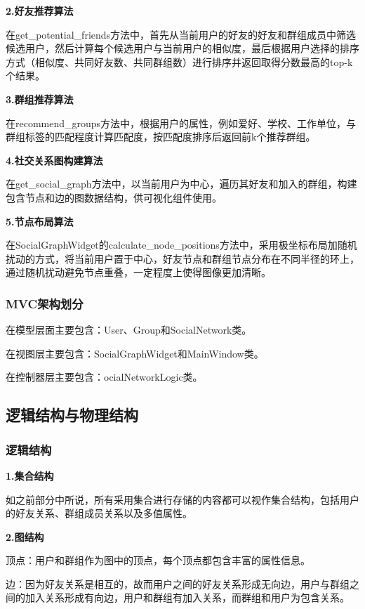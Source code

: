 \documentclass[12pt,a4paper]{article}
\begin{document}
\noindent\textbf{2.好友推荐算法}

在get\_potential\_friends方法中，首先从当前用户的好友的好友和群组成员中筛选候选用户，然后计算每个候选用户与当前用户的相似度，最后根据用户选择的排序方式（相似度、共同好友数、共同群组数）进行排序并返回取得分数最高的top-k个结果。

\noindent\textbf{3.群组推荐算法}

在recommend\_groups方法中，根据用户的属性，例如爱好、学校、工作单位，与群组标签的匹配程度计算匹配度，按匹配度排序后返回前k个推荐群组。

\noindent\textbf{4.社交关系图构建算法}

在get\_social\_graph方法中，以当前用户为中心，遍历其好友和加入的群组，构建包含节点和边的图数据结构，供可视化组件使用。

\noindent\textbf{5.节点布局算法}

在SocialGraphWidget的calculate\_node\_positions方法中，采用极坐标布局加随机扰动的方式，将当前用户置于中心，好友节点和群组节点分布在不同半径的环上，通过随机扰动避免节点重叠，一定程度上使得图像更加清晰。

\subsubsection{MVC架构划分}

在模型层面主要包含：User、Group和SocialNetwork类。

在视图层主要包含：SocialGraphWidget和MainWindow类。

在控制器层主要包含：ocialNetworkLogic类。

\subsection{逻辑结构与物理结构}

\subsubsection{逻辑结构}

\noindent\textbf{1.集合结构}

如之前部分中所说，所有采用集合进行存储的内容都可以视作集合结构，包括用户的好友关系、群组成员关系以及多值属性。

\noindent\textbf{2.图结构}

顶点：用户和群组作为图中的顶点，每个顶点都包含丰富的属性信息。

边：因为好友关系是相互的，故而用户之间的好友关系形成无向边，用户与群组之间的加入关系形成有向边，用户和群组有加入关系，而群组和用户为包含关系。
\end{document}
